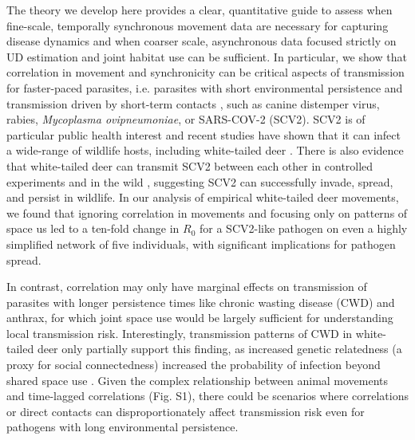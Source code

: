 \documentclass[letterpaper]{article}
\begin{document}
The theory we develop here provides a clear, quantitative guide to assess when fine-scale, temporally synchronous movement data are necessary for capturing disease dynamics and when coarser scale, asynchronous data focused strictly on UD estimation and joint habitat use can be sufficient. 
In particular, we show that correlation in movement and synchronicity can be critical aspects of transmission for faster-paced parasites, i.e. parasites with short environmental persistence and transmission driven by short-term contacts \citep[cf.][]{Dougherty2018,Manlove2022}, such as canine distemper virus, rabies, \emph{Mycoplasma ovipneumoniae}, or SARS-COV-2 (SCV2). 
SCV2 is of particular public health interest and recent studies have shown that it can infect a wide-range of wildlife hosts, including white-tailed deer \citep{Palmer2021,Hale2022}. There is also evidence that white-tailed deer can transmit SCV2 between each other in controlled experiments and in the wild \citep{Martins2022,Hale2022}, suggesting SCV2 can successfully invade, spread, and persist in wildlife.  In our analysis of empirical white-tailed deer movements, we found that ignoring correlation in movements and focusing only on patterns of space us led to a ten-fold change in $R_0$ for a SCV2-like pathogen on even a highly simplified network of five individuals, with significant implications for pathogen spread.    

In contrast, correlation may only have marginal effects on transmission of parasites with longer persistence times like chronic wasting disease (CWD) and anthrax, for which joint space use would be largely sufficient for understanding local transmission risk. %
Interestingly, transmission patterns of CWD in white-tailed deer only partially support this finding, as increased genetic relatedness (a proxy for social connectedness) increased the probability of infection beyond shared space use \citep{Grear2010}. Given the complex relationship between animal movements and time-lagged correlations (Fig. S1), there could be scenarios where correlations or direct contacts can disproportionately affect transmission risk even for pathogens with long environmental persistence. 
\end{document}
